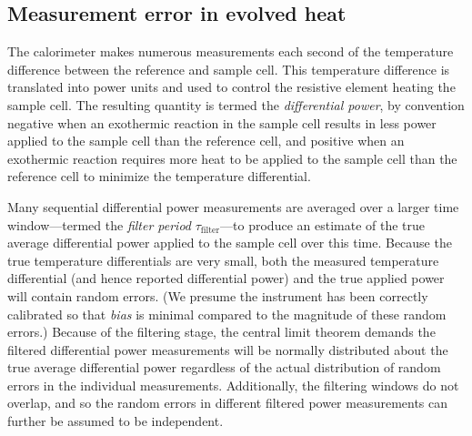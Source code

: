 \documentclass[aps,pre,twocolumn,nofootinbib,superscriptaddress,linenumbers]{revtex4-1}
\begin{document}
\subsection{Measurement error in evolved heat}
\label{section:error-in-heat}

The calorimeter makes numerous measurements each second of the temperature difference between the reference and sample cell.
This temperature difference is translated into power units and used to control the resistive element heating the sample cell.
The resulting quantity is termed the \emph{differential power}, by convention negative when an exothermic reaction in the sample cell results in less power applied to the sample cell than the reference cell, and positive when an exothermic reaction requires more heat to be applied to the sample cell than the reference cell to minimize the temperature differential.

Many sequential differential power measurements are averaged over a larger time window---termed the \emph{filter period} $\tau_\mathrm{filter}$---to produce an estimate of the true average differential power applied to the sample cell over this time.
Because the true temperature differentials are very small, both the measured temperature differential (and hence reported differential power) and the true applied power will contain random errors.
(We presume the instrument has been correctly calibrated so that \emph{bias} is minimal compared to the magnitude of these random errors.)
Because of the filtering stage, the central limit theorem demands the filtered differential power measurements will be normally distributed about the true average differential power regardless of the actual distribution of random errors in the individual measurements.
Additionally, the filtering windows do not overlap, and so the random errors in different filtered power measurements can further be assumed to be independent.
\end{document}
